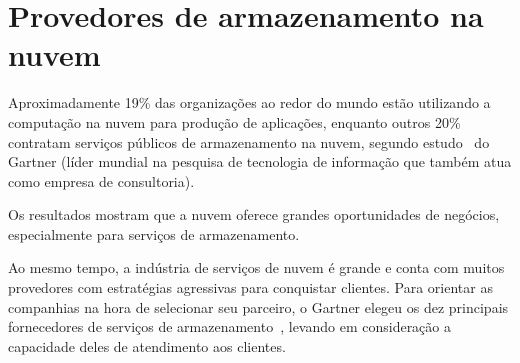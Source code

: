 \section{Provedores de armazenamento na nuvem}

Aproximadamente 19\% das organizações ao redor do mundo estão utilizando a 
computação na nuvem para produção de aplicações, enquanto outros 20\% contratam 
serviços públicos de armazenamento na nuvem, segundo 
estudo~\cite{gartner-public-cloud-services} do Gartner (líder mundial na pesquisa de 
tecnologia de informação que também atua como empresa de consultoria).

\cite{gartner-one-third}

Os resultados mostram que a nuvem oferece grandes oportunidades de negócios,
especialmente para serviços de armazenamento. 

Ao mesmo tempo, a indústria de serviços de nuvem é grande e conta com muitos 
provedores com estratégias agressivas para conquistar clientes. Para orientar as 
companhias na hora de selecionar seu parceiro, o Gartner elegeu os dez principais 
fornecedores de serviços de armazenamento~\cite{gartner-top-10}, levando em 
consideração a capacidade deles de atendimento aos clientes.



